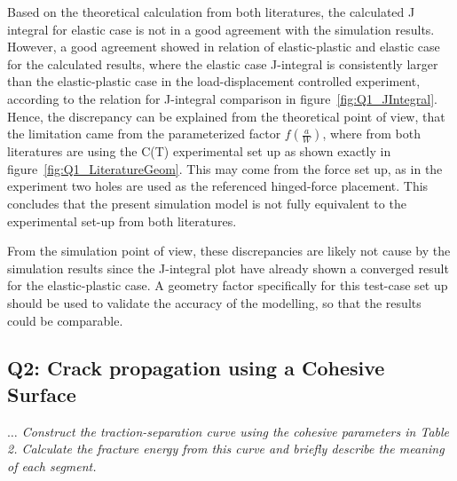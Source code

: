 \documentclass[12pt]{article}
\begin{document}
\hspace{1em}Based on the theoretical calculation from both literatures, the calculated J integral for elastic case is not in a good 
agreement with the simulation results. However, a good agreement showed in relation of elastic-plastic and elastic case 
for the calculated results, where the elastic case J-integral
is consistently larger than the elastic-plastic case in the load-displacement controlled experiment, according to the relation for J-integral comparison in figure~\ref{fig:Q1_JIntegral}. 
Hence, the discrepancy can be explained from the theoretical point of view, that the limitation came
from the parameterized factor $f(\frac{a}{W})$, where from both literatures are using the C(T) experimental set up as shown exactly in 
figure~\ref{fig:Q1_LiteratureGeom}. This may come from the force set up, as in the experiment two holes are used
as the referenced hinged-force placement. This concludes that the present simulation model is not fully equivalent 
to the experimental set-up from both literatures. 

\hspace{1em}From the simulation point of view, these discrepancies are likely not cause by the simulation results since
the J-integral plot have already shown a converged result for the elastic-plastic case. A geometry factor specifically for this test-case set up
should be used to validate the accuracy of the modelling, so that the results could be comparable.




\newpage
\subsection*{Q2: Crack propagation using a Cohesive Surface}

\vspace{1em}
\begin{tcolorbox}[title=Traction-separation law]
  \textit{$\dots$ Construct the traction-separation curve using the cohesive parameters in Table 2. 
Calculate the fracture energy from this curve and briefly describe the meaning of each segment.}
\end{tcolorbox}
\end{document}

